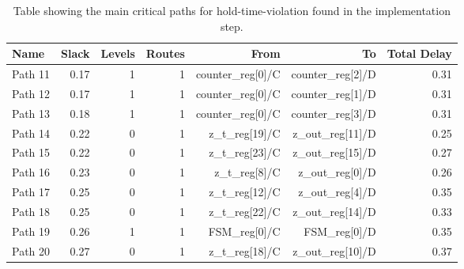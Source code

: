 \begin{table}[ht]
    \centering
    \small
    \captionsetup{skip=10pt} 
    \begin{tabular}{lrrrrrr}
        \hline
        Name    & Slack & Levels & Routes  & From                              & To                    & Total Delay \\
        \hline
        Path 11 & 0.17  & 1      & 1       & counter\_reg[0]/C                & counter\_reg[2]/D     & 0.31       \\
        Path 12 & 0.17  & 1      & 1       & counter\_reg[0]/C                & counter\_reg[1]/D     & 0.31       \\
        Path 13 & 0.18  & 1      & 1       & counter\_reg[0]/C                & counter\_reg[3]/D     & 0.31       \\
        Path 14 & 0.22  & 0      & 1       & z\_t\_reg[19]/C                  & z\_out\_reg[11]/D     & 0.25       \\
        Path 15 & 0.22  & 0      & 1       & z\_t\_reg[23]/C                  & z\_out\_reg[15]/D     & 0.27       \\
        Path 16 & 0.23  & 0      & 1       & z\_t\_reg[8]/C                   & z\_out\_reg[0]/D      & 0.26       \\
        Path 17 & 0.25  & 0      & 1       & z\_t\_reg[12]/C                  & z\_out\_reg[4]/D      & 0.35       \\
        Path 18 & 0.25  & 0      & 1       & z\_t\_reg[22]/C                  & z\_out\_reg[14]/D     & 0.33       \\
        Path 19 & 0.26  & 1      & 1       & FSM\_reg[0]/C                    & FSM\_reg[0]/D         & 0.35 \\
        Path 20 & 0.27  & 0      & 1       & z\_t\_reg[18]/C                  & z\_out\_reg[10]/D     & 0.37       \\
        \hline
    \end{tabular}
    \caption{Table showing the main critical paths for hold-time-violation found in the implementation step.}
    \label{tab:hold_implementation}
\end{table}




